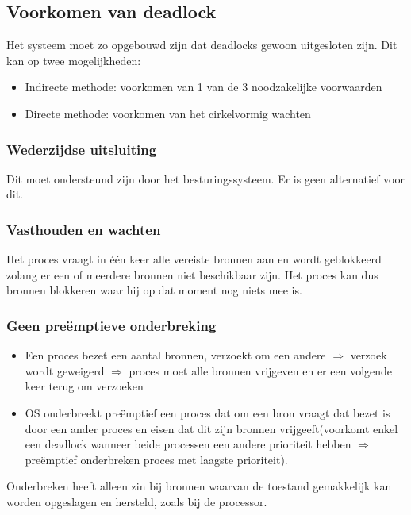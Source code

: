 \subsection{Voorkomen van deadlock}

Het systeem moet zo opgebouwd zijn dat deadlocks gewoon uitgesloten zijn. Dit kan op twee mogelijkheden:

\begin{itemize}
\item Indirecte methode: voorkomen van 1 van de 3 noodzakelijke voorwaarden
\item Directe methode: voorkomen van het cirkelvormig wachten
\end{itemize}

\subsubsection{Wederzijdse uitsluiting}

Dit moet ondersteund zijn door het besturingssysteem. Er is geen alternatief voor dit.

\subsubsection{Vasthouden en wachten}

Het proces vraagt in één keer alle vereiste bronnen aan en wordt geblokkeerd zolang er een of meerdere bronnen niet beschikbaar zijn. Het proces kan dus bronnen blokkeren waar hij op dat moment nog niets mee is.

\subsubsection{Geen preëmptieve onderbreking}

\begin{itemize}
\item Een proces bezet een aantal bronnen, verzoekt om een andere $\Rightarrow$ verzoek wordt geweigerd $\Rightarrow$ proces moet alle bronnen vrijgeven en er een volgende keer terug om verzoeken
\item OS onderbreekt preëmptief een proces dat om een bron vraagt dat bezet is door een ander proces en eisen dat dit zijn bronnen vrijgeeft(voorkomt enkel een deadlock wanneer beide processen een andere prioriteit hebben $\Rightarrow$ preëmptief onderbreken proces met laagste prioriteit).
\end{itemize}

Onderbreken heeft alleen zin bij bronnen waarvan de toestand gemakkelijk kan worden opgeslagen en hersteld, zoals bij de processor.


